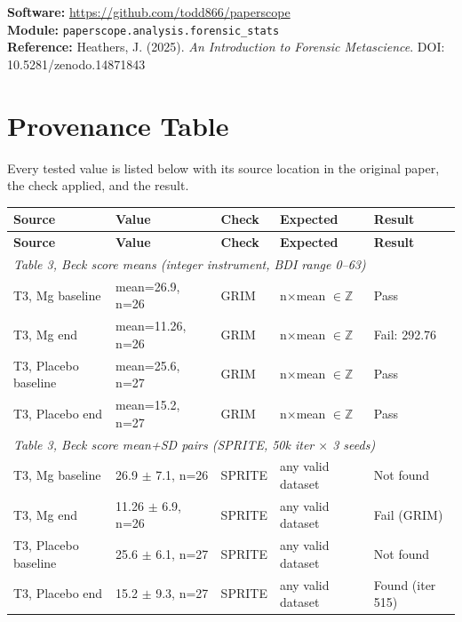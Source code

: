 \documentclass[11pt]{article}
\begin{document}
\medskip
\noindent\textbf{Software:} \url{https://github.com/todd866/paperscope}\\
\textbf{Module:} \texttt{paperscope.analysis.forensic\_stats}\\
\textbf{Reference:} Heathers, J. (2025). \textit{An Introduction to Forensic Metascience}. DOI: 10.5281/zenodo.14871843

\newpage
\appendix
\section{Provenance Table}

Every tested value is listed below with its source location in the original paper, the check applied, and the result.

\small
\begin{longtable}{p{3.5cm}p{2.2cm}p{1.8cm}p{2.5cm}p{2.5cm}}
\toprule
\textbf{Source} & \textbf{Value} & \textbf{Check} & \textbf{Expected} & \textbf{Result} \\
\midrule
\endfirsthead
\toprule
\textbf{Source} & \textbf{Value} & \textbf{Check} & \textbf{Expected} & \textbf{Result} \\
\midrule
\endhead

\multicolumn{5}{l}{\textit{Table 3, Beck score means (integer instrument, BDI range 0--63)}} \\
\midrule
T3, Mg baseline & mean=26.9, n=26 & GRIM & n$\times$mean $\in \mathbb{Z}$ & \textcolor{pass}{Pass} \\
T3, Mg end & mean=11.26, n=26 & GRIM & n$\times$mean $\in \mathbb{Z}$ & \textcolor{fail}{Fail: 292.76} \\
T3, Placebo baseline & mean=25.6, n=27 & GRIM & n$\times$mean $\in \mathbb{Z}$ & \textcolor{pass}{Pass} \\
T3, Placebo end & mean=15.2, n=27 & GRIM & n$\times$mean $\in \mathbb{Z}$ & \textcolor{pass}{Pass} \\
\midrule

\multicolumn{5}{l}{\textit{Table 3, Beck score mean+SD pairs (SPRITE, 50k iter $\times$ 3 seeds)}} \\
\midrule
T3, Mg baseline & 26.9 $\pm$ 7.1, n=26 & SPRITE & any valid dataset & \textcolor{flag}{Not found} \\
T3, Mg end & 11.26 $\pm$ 6.9, n=26 & SPRITE & any valid dataset & \textcolor{fail}{Fail (GRIM)} \\
T3, Placebo baseline & 25.6 $\pm$ 6.1, n=27 & SPRITE & any valid dataset & \textcolor{flag}{Not found} \\
T3, Placebo end & 15.2 $\pm$ 9.3, n=27 & SPRITE & any valid dataset & \textcolor{pass}{Found (iter 515)} \\
\midrule


\end{longtable}
\end{document}
